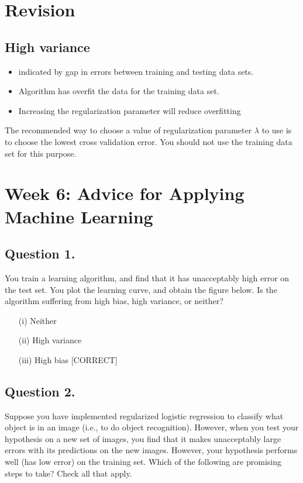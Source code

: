\documentclass[11pt]{article} %
\begin{document}

\section*{Revision}
\subsection*{High variance}

\begin{itemize}
	\item indicated by gap in errors between training and testing data sets.
	\item Algorithm has overfit the data for the training data set.
	\item Increasing the regularization parameter will reduce overfitting
\end{itemize}
The recommended way to choose a value of regularization parameter $\lambda$ to use is to choose
the lowest cross validation error.
You should not use the training data set for this purpose.

\newpage
\section*{Week 6: Advice for Applying Machine Learning}

\subsection*{Question 1. }
You train a learning algorithm, and find that it has unacceptably high error on the test set. You plot the learning curve, and obtain the figure below. Is the algorithm suffering from high bias, high variance, or neither?

\begin{itemize}
	\item[(i)] Neither
	
	\item[(ii)] High variance
	
	\item[(iii)] High bias [CORRECT]
\end{itemize}


\subsection*{Question 2. }
Suppose you have implemented regularized logistic regression  to classify what object is in an image (i.e., to do object recognition). However, when you test your hypothesis on a new set of images, you find that it makes unacceptably large errors with its predictions on the new images. However, your hypothesis performs well (has low error) on the training set. Which of the following are promising steps to take? Check all that apply.
\end{document}
